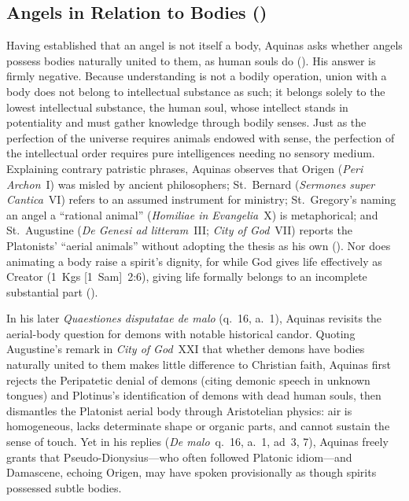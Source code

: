 \subsection{Angels in Relation to Bodies ()}

Having established that an angel is not itself a body, Aquinas asks whether angels possess bodies naturally united to them, as human souls do (). His answer is firmly negative. Because understanding is not a bodily operation, union with a body does not belong to intellectual substance as such; it belongs solely to the lowest intellectual substance, the human soul, whose intellect stands in potentiality and must gather knowledge through bodily senses. Just as the perfection of the universe requires animals endowed with sense, the perfection of the intellectual order requires pure intelligences needing no sensory medium. Explaining contrary patristic phrases, Aquinas observes that Origen (\emph{Peri Archon}~I) was misled by ancient philosophers; St.~Bernard (\emph{Sermones super Cantica}~VI) refers to an assumed instrument for ministry; St.~Gregory's naming an angel a ``rational animal'' (\emph{Homiliae in Evangelia}~X) is metaphorical; and St.~Augustine (\emph{De Genesi ad litteram}~III; \emph{City of God}~VII) reports the Platonists' ``aerial animals'' without adopting the thesis as his own (). Nor does animating a body raise a spirit's dignity, for while God gives life effectively as Creator (1~Kgs [1~Sam]~2:6), giving life formally belongs to an incomplete substantial part ().

In his later \emph{Quaestiones disputatae de malo} (q.~16, a.~1), Aquinas revisits the aerial-body question for demons with notable historical candor. Quoting Augustine's remark in \emph{City of God}~XXI that whether demons have bodies naturally united to them makes little difference to Christian faith, Aquinas first rejects the Peripatetic denial of demons (citing demonic speech in unknown tongues) and Plotinus's identification of demons with dead human souls, then dismantles the Platonist aerial body through Aristotelian physics: air is homogeneous, lacks determinate shape or organic parts, and cannot sustain the sense of touch. Yet in his replies (\emph{De malo}~q.~16, a.~1, ad~3, 7), Aquinas freely grants that Pseudo-Dionysius---who often followed Platonic idiom---and Damascene, echoing Origen, may have spoken provisionally as though spirits possessed subtle bodies.

